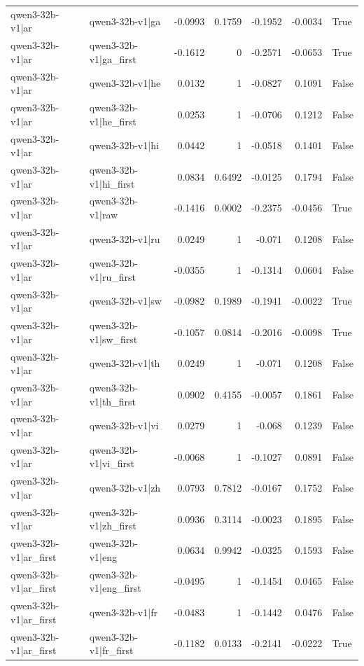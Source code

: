 \begin{table}
\begin{tabular}{l l r r r r l}
qwen3-32b-v1|ar & qwen3-32b-v1|ga & -0.0993 & 0.1759 & -0.1952 & -0.0034 & True \\
qwen3-32b-v1|ar & qwen3-32b-v1|ga_first & -0.1612 & 0 & -0.2571 & -0.0653 & True \\
qwen3-32b-v1|ar & qwen3-32b-v1|he & 0.0132 & 1 & -0.0827 & 0.1091 & False \\
qwen3-32b-v1|ar & qwen3-32b-v1|he_first & 0.0253 & 1 & -0.0706 & 0.1212 & False \\
qwen3-32b-v1|ar & qwen3-32b-v1|hi & 0.0442 & 1 & -0.0518 & 0.1401 & False \\
qwen3-32b-v1|ar & qwen3-32b-v1|hi_first & 0.0834 & 0.6492 & -0.0125 & 0.1794 & False \\
qwen3-32b-v1|ar & qwen3-32b-v1|raw & -0.1416 & 0.0002 & -0.2375 & -0.0456 & True \\
qwen3-32b-v1|ar & qwen3-32b-v1|ru & 0.0249 & 1 & -0.071 & 0.1208 & False \\
qwen3-32b-v1|ar & qwen3-32b-v1|ru_first & -0.0355 & 1 & -0.1314 & 0.0604 & False \\
qwen3-32b-v1|ar & qwen3-32b-v1|sw & -0.0982 & 0.1989 & -0.1941 & -0.0022 & True \\
qwen3-32b-v1|ar & qwen3-32b-v1|sw_first & -0.1057 & 0.0814 & -0.2016 & -0.0098 & True \\
qwen3-32b-v1|ar & qwen3-32b-v1|th & 0.0249 & 1 & -0.071 & 0.1208 & False \\
qwen3-32b-v1|ar & qwen3-32b-v1|th_first & 0.0902 & 0.4155 & -0.0057 & 0.1861 & False \\
qwen3-32b-v1|ar & qwen3-32b-v1|vi & 0.0279 & 1 & -0.068 & 0.1239 & False \\
qwen3-32b-v1|ar & qwen3-32b-v1|vi_first & -0.0068 & 1 & -0.1027 & 0.0891 & False \\
qwen3-32b-v1|ar & qwen3-32b-v1|zh & 0.0793 & 0.7812 & -0.0167 & 0.1752 & False \\
qwen3-32b-v1|ar & qwen3-32b-v1|zh_first & 0.0936 & 0.3114 & -0.0023 & 0.1895 & False \\
qwen3-32b-v1|ar_first & qwen3-32b-v1|eng & 0.0634 & 0.9942 & -0.0325 & 0.1593 & False \\
qwen3-32b-v1|ar_first & qwen3-32b-v1|eng_first & -0.0495 & 1 & -0.1454 & 0.0465 & False \\
qwen3-32b-v1|ar_first & qwen3-32b-v1|fr & -0.0483 & 1 & -0.1442 & 0.0476 & False \\
qwen3-32b-v1|ar_first & qwen3-32b-v1|fr_first & -0.1182 & 0.0133 & -0.2141 & -0.0222 & True \\

\end{tabular}
\end{table}
